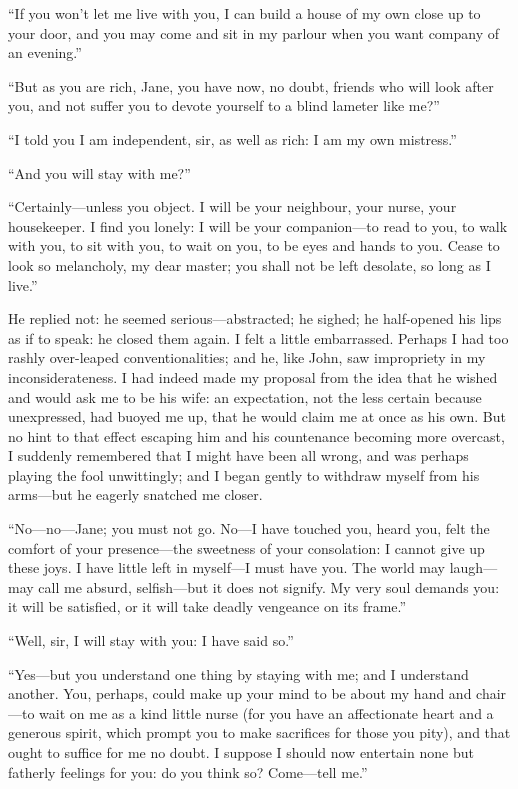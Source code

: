\enquote{If you won't let me live with you, I can build a house of my
	own close up to your door, and you may come and sit in my parlour when
	you want company of an evening.}

\enquote{But as you are rich, Jane, you have now, no doubt, friends who
	will look after you, and not suffer you to devote yourself to a blind
	lameter like me?}

\enquote{I told you I am independent, sir, as well as rich: I am my own
	mistress.}

\enquote{And you will stay with me?}

\enquote{Certainly---unless you object. I will be your neighbour, your
	nurse, your housekeeper. I find you lonely: I will be your
	companion---to read to you, to walk with you, to sit with you, to wait
	on you, to be eyes and hands to you. Cease to look so melancholy, my
	dear master; you shall not be left desolate, so long as I live.}

He replied not: he seemed serious---abstracted; he sighed; he
half-opened his lips as if to speak: he closed them again. I felt a
little embarrassed. Perhaps I had too rashly over-leaped
conventionalities; and he, like \St{} John, saw impropriety in my
inconsiderateness. I had indeed made my proposal from the idea that he
wished and would ask me to be his wife: an expectation, not the less
certain because unexpressed, had buoyed me up, that he would claim me at
once as his own. But no hint to that effect escaping him and his
countenance becoming more overcast, I suddenly remembered that I might
have been all wrong, and was perhaps playing the fool unwittingly; and I
began gently to withdraw myself from his arms---but he eagerly snatched
me closer.

\enquote{No---no---Jane; you must not go. No---I have touched you,
	heard you, felt the comfort of your presence---the sweetness of your
	consolation: I cannot give up these joys. I have little left in
	myself---I must have you. The world may laugh---may call me absurd,
	selfish---but it does not signify. My very soul demands you: it will be
	satisfied, or it will take deadly vengeance on its frame.}

\enquote{Well, sir, I will stay with you: I have said so.}

\enquote{Yes---but you understand one thing by staying with me; and I
	understand another. You, perhaps, could make up your mind to be about
	my hand and chair---to wait on me as a kind little nurse (for you have
	an affectionate heart and a generous spirit, which prompt you to make
	sacrifices for those you pity), and that ought to suffice for me no
	doubt. I suppose I should now entertain none but fatherly feelings for
	you: do you think so? Come---tell me.}

